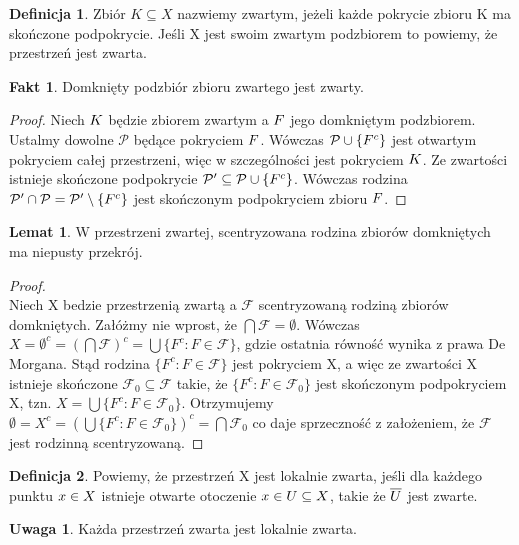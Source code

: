 \documentclass[12pt, a4paper, 2.5cm]{article}
\theoremstyle{definition}
\newtheorem{definition}{Definicja}
\newtheorem{lemma}{Lemat}
\newtheorem{fact}{Fakt}
\newtheorem{remark}{Uwaga}
\begin{document}
	\begin{definition}
		Zbiór $K\subseteq X$ nazwiemy zwartym, jeżeli każde pokrycie zbioru K ma skończone podpokrycie. Jeśli X jest swoim zwartym podzbiorem to powiemy, że  przestrzeń jest zwarta.
	\end{definition}
	\begin{fact}
		Domknięty podzbiór zbioru zwartego jest zwarty.
	\end{fact}
	\begin{proof}
		Niech $\mathnormal{K}$ będzie zbiorem zwartym a $\mathnormal{F}$ jego domkniętym podzbiorem. Ustalmy dowolne $\mathcal{P}$ będące pokryciem $\mathnormal{F}$. Wówczas $\mathcal{P}\cup\{\mathnormal{F^c}\}$ jest otwartym pokryciem całej przestrzeni, więc w szczególności jest pokryciem $\mathnormal{K}$. Ze zwartości istnieje skończone podpokrycie $\mathcal{P'}\subseteq\mathcal{P}\cup\{\mathnormal{F^c}\}$. Wówczas rodzina $\mathcal{P'}\cap\mathcal{P}=\mathcal{P'}\setminus\{\mathnormal{F^c}\}$ jest skończonym podpokryciem zbioru $\mathnormal{F}$.
	\end{proof}
	\begin{lemma}
		W przestrzeni zwartej, scentryzowana rodzina zbiorów domkniętych ma niepusty przekrój.
	\end{lemma}
	\begin{proof}
		~\\
		Niech X bedzie przestrzenią zwartą a $\mathcal{F}$ scentryzowaną rodziną zbiorów domkniętych. Załóżmy nie wprost, że $\bigcap\mathcal{F}=\emptyset$. Wówczas $X=\emptyset^c=(\bigcap\mathcal{F})^c=\bigcup\{F^c:F\in\mathcal{F}\}$, gdzie ostatnia równość wynika z prawa De Morgana. Stąd rodzina $\{F^c:F\in\mathcal{F}\}$ jest pokryciem X, a więc ze zwartości X istnieje skończone $\mathcal{F}_0\subseteq\mathcal{F}$ takie, że $\{F^c:F\in\mathcal{F}_0\}$ jest skończonym podpokryciem X, tzn. $X=\bigcup\{F^c:F\in\mathcal{F}_0\}$. Otrzymujemy $\emptyset=X^c=(\bigcup\{F^c:F\in\mathcal{F}_0\})^c=\bigcap\mathcal{F}_0$ co daje sprzeczność z założeniem, że $\mathcal{F}$ jest rodzinną scentryzowaną.
	\end{proof}
	\begin{definition}
		Powiemy, że przestrzeń X jest lokalnie zwarta, jeśli dla każdego punktu $\mathnormal{x}\in X$ istnieje otwarte otoczenie $\mathnormal{x}\in\mathnormal{U}\subseteq X$, takie że $\mathnormal{\overline{U}}$ jest zwarte.
	\end{definition}
	\begin{remark}
		Każda przestrzeń zwarta jest lokalnie zwarta.
	\end{remark}
\end{document}
